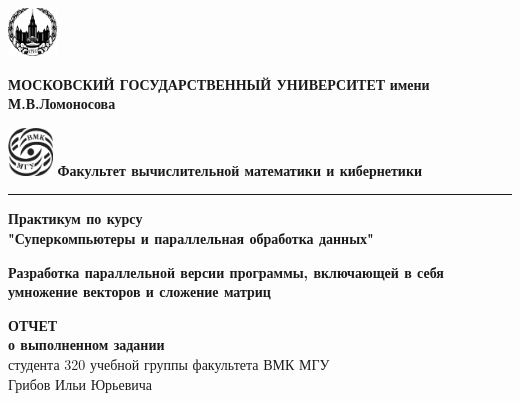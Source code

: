 \documentclass{article}
\begin{document}
\begin{titlepage}
      
\end{titlepage}

\begin{titlepage}
	\begin{center}
	\includegraphics[height=0.5in]{msu.png}
	\hfill
	\begin{minipage}[b]{0.77\textwidth}
		\centering
		\textbf{\fontsize{12}{9}\selectfont МОСКОВСКИЙ ГОСУДАРСТВЕННЫЙ УНИВЕРСИТЕТ}
		\bigbreak
		\textbf{\fontsize{12}{9}\selectfont имени М.В.Ломоносова}
	\end{minipage}
	\hfill
	\includegraphics[height=0.5in]{vmk.png}
	\bigbreak
	\textbf{\fontsize{12}{9}\selectfont Факультет вычислительной математики и кибернетики}
	\end{center}
	\vspace{-0.1cm}
	\hrule
	
	\vspace{5cm}
	\begin{center}
	{\fontsize{16}{30}\selectfont 
	\bf Практикум по курсу\\
	"Суперкомпьютеры и параллельная обработка данных"\\
	}
	
	\fontsize{12}{30}\selectfont\bf {Разработка параллельной версии программы, включающей в себя умножение векторов и сложение матриц
	}
				
	\vspace{2cm}
	
	{\fontsize{16}{30}\selectfont 
	\textbf{ОТЧЕТ\\
	о выполненном задании\\}
	студента 320 учебной группы факультета ВМК МГУ\\
	Грибов Ильи Юрьевича\\}
	\end{center}
	
	\vfill
\end{titlepage}
\end{document}
